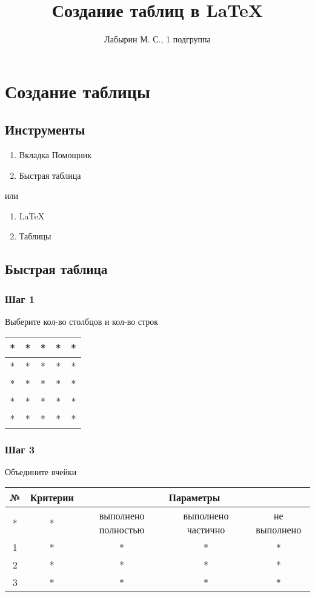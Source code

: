 \documentclass[12pt]{article}
\author{Лабырин М. С., 1 подгруппа}
\title{Создание таблиц в \LaTeX{}}
\begin{document}
\maketitle

\section{Создание таблицы}

\subsection{Инструменты}

\begin{enumerate}
  \item Вкладка Помощник
  \item Быстрая таблица
\end{enumerate}

или

\begin{enumerate}
  \item \LaTeX{}
  \item Таблицы
\end{enumerate}

\subsection{Быстрая таблица}

\subsubsection{Шаг 1}

Выберите кол-во столбцов и кол-во строк\\
\begin{tabular}{|c|c|c|c|c|}
  \hline
  * & * & * & * & * \\
  \hline
  * & * & * & * & * \\
  \hline
  * & * & * & * & * \\
  \hline
  * & * & * & * & * \\
  \hline
  * & * & * & * & * \\
  \hline
\end{tabular}

\subsubsection{Шаг 3}

Объедините ячейки\\
\begin{tabular}{|c|c|c|c|c|}
  \hline
  № & Критерии & \multicolumn{3}{|c|}{Параметры}\\
  \hline
  * & * & выполнено полностью & выполнено частично & не выполнено \\
  \hline
  1 & * & * & * & * \\
  \hline
  2 & * & * & * & * \\
  \hline
  3 & * & * & * & * \\
  \hline
\end{tabular}
\end{document}
